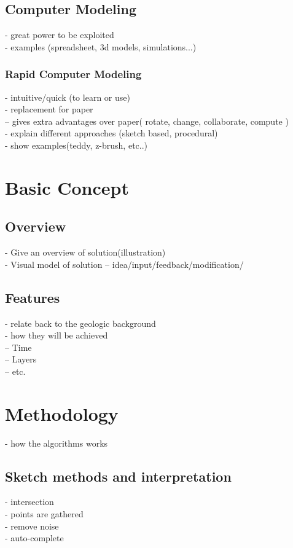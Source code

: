 \documentclass[a4paper,10pt]{article}
\begin{document}
\subsection{Computer Modeling}
- great power to be exploited\\
- examples (spreadsheet, 3d models, simulations...)\\
\subsubsection{Rapid Computer Modeling}
- intuitive/quick (to learn or use)\\
- replacement for paper\\
  -- gives extra advantages over paper( rotate, change, collaborate, compute )\\
- explain different approaches (sketch based, procedural)\\
- show examples(teddy, z-brush, etc..)\\


\section{Basic Concept}
\label{sec:concept}
\subsection{Overview}
- Give an overview of solution(illustration)\\
- Visual model of solution
  -- idea/input/feedback/modification/
\subsection{Features}
- relate back to the geologic background\\
- how they will be achieved\\
   -- Time\\
   -- Layers\\
   -- etc.\\

\section{Methodology}
- how the algorithms works
\subsection{Sketch methods and interpretation}
- intersection\\
- points are gathered\\
- remove noise\\
- auto-complete
\end{document}
